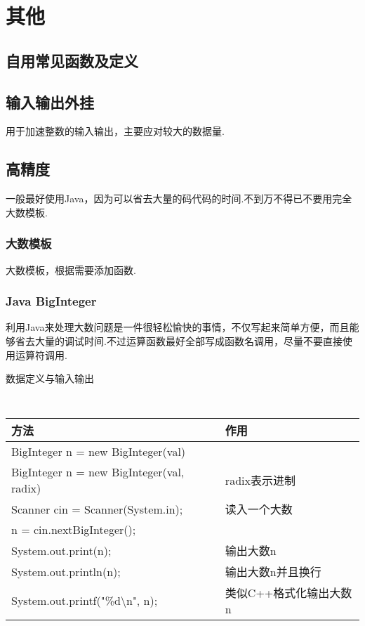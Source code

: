 \chapter{其他}
\section{自用常见函数及定义}\small



\section{输入输出外挂}\small
用于加速整数的输入输出，主要应对较大的数据量.



\section{高精度}\small
一般最好使用Java，因为可以省去大量的码代码的时间.不到万不得已不要用完全
大数模板.


    \subsection{大数模板}\small
大数模板，根据需要添加函数.



    \subsection{Java BigInteger}\small
利用Java来处理大数问题是一件很轻松愉快的事情，不仅写起来简单方便，而且能
够省去大量的调试时间.不过运算函数最好全部写成函数名调用，尽量不要直接使
用运算符调用.

数据定义与输入输出
{\tt
    \begin{longtable}{|p{9.3cm}|p{6cm}|}
    \hline
    方法 & 作用 \\
    \hline
    BigInteger n = new BigInteger(val) & \\
    \hline
    BigInteger n = new BigInteger(val, radix) & radix表示进制 \\
    \hline
    Scanner cin = Scanner(System.in); & 读入一个大数 \\
    n = cin.nextBigInteger(); & \\
    \hline
    System.out.print(n); & 输出大数n \\
    \hline
    System.out.println(n); & 输出大数n并且换行 \\
    \hline
    System.out.printf("\%d\textbackslash n", n); & 类似C++格式化输出大数n \\
    \hline
    \end{longtable}
}

